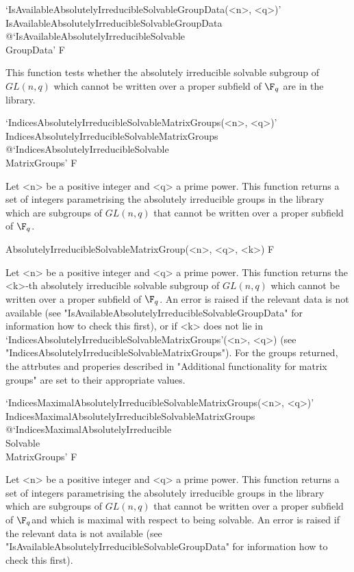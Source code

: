 \>`IsAvailableAbsolutelyIrreducibleSolvableGroupData(<n>, <q>)'%
{IsAvailableAbsolutelyIrreducibleSolvableGroupData}%
@{`IsAvailableAbsolutelyIrreducibleSolvable\\GroupData'} F

This function tests whether the
absolutely irreducible solvable subgroup of $GL(n,q)$ which
cannot be written over a proper subfield of $\F_q$ are in the {\IRREDSOL} library.


\>`IndicesAbsolutelyIrreducibleSolvableMatrixGroups(<n>, <q>)'%
{IndicesAbsolutelyIrreducibleSolvableMatrixGroups}%
@{`IndicesAbsolutelyIrreducibleSolvable\\MatrixGroups'} F

Let <n> be a  positive integer and <q> a prime power. This
function returns a set of integers parametrising the absolutely irreducible groups in the
{\IRREDSOL} library which are subgroups of $GL(n,q)$ that cannot be written over a proper
subfield of
$\F_q$.


\>AbsolutelyIrreducibleSolvableMatrixGroup(<n>, <q>, <k>) F

Let <n> be a  positive integer and <q> a prime power. This
function returns the <k>-th absolutely irreducible solvable subgroup of $GL(n,q)$ which
cannot be written over a proper subfield of $\F_q$. An error is raised if the relevant
data is not available (see "IsAvailableAbsolutelyIrreducibleSolvableGroupData" for information 
how to check this first), or if <k> does not lie in
`IndicesAbsolutelyIrreducibleSolvableMatrixGroups'(<n>, <q>)
(see "IndicesAbsolutelyIrreducibleSolvableMatrixGroups"). For the groups returned, the attrbutes and
properies described in "Additional functionality for matrix groups" are set to their appropriate values.



\>`IndicesMaximalAbsolutelyIrreducibleSolvableMatrixGroups(<n>, <q>)'%
{IndicesMaximalAbsolutelyIrreducibleSolvableMatrixGroups}%
@{`IndicesMaximalAbsolutelyIrreducible\\Solvable\\MatrixGroups'} F

Let <n> be a  positive integer and <q> a prime power. This
function returns a set of integers parametrising the absolutely irreducible groups in the
{\IRREDSOL} library which are subgroups of $GL(n,q)$ that cannot be written over a proper
subfield of
$\F_q $and which is maximal with
respect to being solvable. An error is raised if the relevant
data is not available (see "IsAvailableAbsolutelyIrreducibleSolvableGroupData" for information 
how to check this first).

